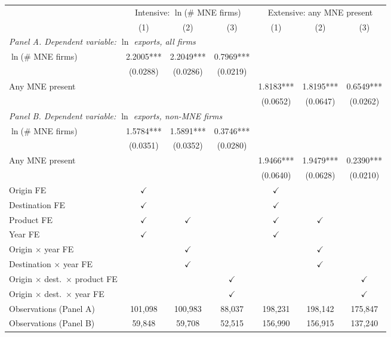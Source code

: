 \begin{tabular}{lcccccc} \hline
 & \multicolumn{3}{c}{Intensive: $\ln$(\# MNE firms)} & \multicolumn{3}{c}{Extensive: any MNE present} \\
 & (1) & (2) & (3) & (1) & (2) & (3) \\ \hline
\multicolumn{7}{l}{\textit{Panel A. Dependent variable: $\ln$ exports, all firms}} \\
$\ln$(\# MNE firms) & 2.2005*** & 2.2049*** & 0.7969*** &  &  &  \\
 & (0.0288) & (0.0286) & (0.0219) &  &  &  \\
Any MNE present &  &  &  & 1.8183*** & 1.8195*** & 0.6549*** \\
 &  &  &  & (0.0652) & (0.0647) & (0.0262) \\
\midrule
\multicolumn{7}{l}{\textit{Panel B. Dependent variable: $\ln$ exports, non-MNE firms}} \\
$\ln$(\# MNE firms) & 1.5784*** & 1.5891*** & 0.3746*** &  &  &  \\
 & (0.0351) & (0.0352) & (0.0280) &  &  &  \\
Any MNE present &  &  &  & 1.9466*** & 1.9479*** & 0.2390*** \\
 &  &  &  & (0.0640) & (0.0628) & (0.0210) \\
\hline
Origin FE & $\checkmark$ &  &  & $\checkmark$ &  &  \\
Destination FE & $\checkmark$ &  &  & $\checkmark$ &  &  \\
Product FE & $\checkmark$ & $\checkmark$ &  & $\checkmark$ & $\checkmark$ &  \\
Year FE & $\checkmark$ &  &  & $\checkmark$ &  &  \\
Origin $\times$ year FE &  & $\checkmark$ &  &  & $\checkmark$ &  \\
Destination $\times$ year FE &  & $\checkmark$ &  &  & $\checkmark$ &  \\
Origin $\times$ dest.\ $\times$ product FE &  &  & $\checkmark$ &  &  & $\checkmark$ \\
Origin $\times$ dest.\ $\times$ year FE &  &  & $\checkmark$ &  &  & $\checkmark$ \\
Observations (Panel A) & 101,098 & 100,983 & 88,037 & 198,231 & 198,142 & 175,847 \\
Observations (Panel B) & 59,848 & 59,708 & 52,515 & 156,990 & 156,915 & 137,240 \\
\hline
\end{tabular}
